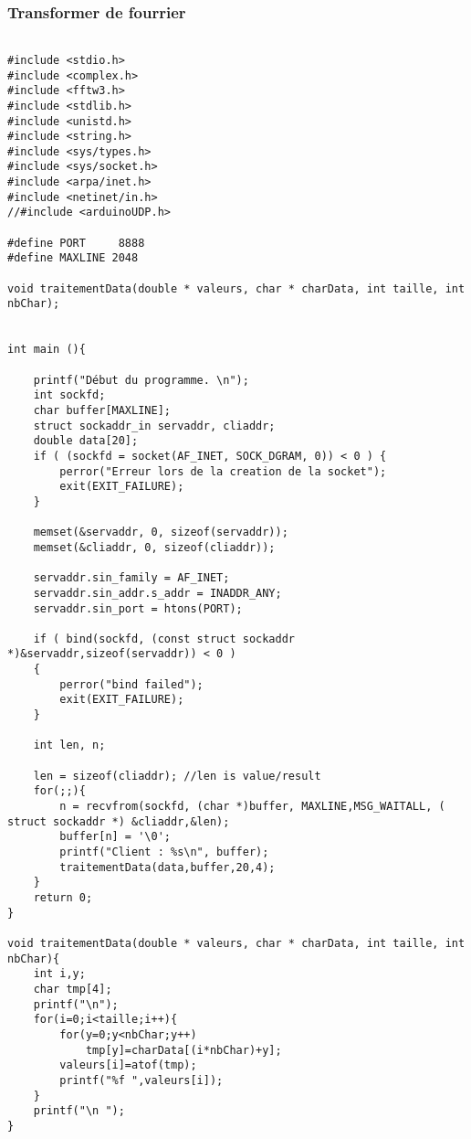 \subsubsection*{Transformer de fourrier}
\begin{scriptsize}
\begin{lstlisting}

#include <stdio.h>
#include <complex.h>
#include <fftw3.h>
#include <stdlib.h>
#include <unistd.h>
#include <string.h>
#include <sys/types.h>
#include <sys/socket.h>
#include <arpa/inet.h>
#include <netinet/in.h>
//#include <arduinoUDP.h>

#define PORT	 8888
#define MAXLINE 2048

void traitementData(double * valeurs, char * charData, int taille, int nbChar);


int main (){

	printf("Début du programme. \n");
	int sockfd;
	char buffer[MAXLINE];
	struct sockaddr_in servaddr, cliaddr;
	double data[20];
	if ( (sockfd = socket(AF_INET, SOCK_DGRAM, 0)) < 0 ) {
		perror("Erreur lors de la creation de la socket");
		exit(EXIT_FAILURE);
	}

	memset(&servaddr, 0, sizeof(servaddr));
	memset(&cliaddr, 0, sizeof(cliaddr));

	servaddr.sin_family = AF_INET; 
	servaddr.sin_addr.s_addr = INADDR_ANY;
	servaddr.sin_port = htons(PORT);

	if ( bind(sockfd, (const struct sockaddr *)&servaddr,sizeof(servaddr)) < 0 )
	{
		perror("bind failed");
		exit(EXIT_FAILURE);
	}

	int len, n;

	len = sizeof(cliaddr); //len is value/result
	for(;;){
		n = recvfrom(sockfd, (char *)buffer, MAXLINE,MSG_WAITALL, ( struct sockaddr *) &cliaddr,&len);
		buffer[n] = '\0';
		printf("Client : %s\n", buffer);
		traitementData(data,buffer,20,4);
	}
	return 0;
}

void traitementData(double * valeurs, char * charData, int taille, int nbChar){
	int i,y;
	char tmp[4];
	printf("\n");
	for(i=0;i<taille;i++){
		for(y=0;y<nbChar;y++)
			tmp[y]=charData[(i*nbChar)+y];
		valeurs[i]=atof(tmp);
		printf("%f ",valeurs[i]);
	}
	printf("\n ");
}
\end{lstlisting}
\end{scriptsize} 

